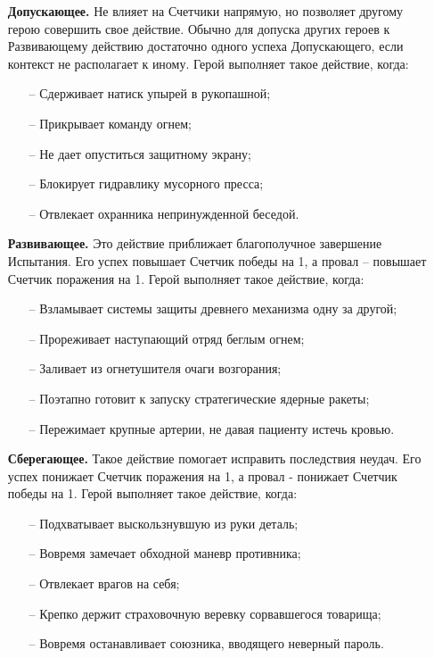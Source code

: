 \begin{itemize}
    \item[]\textbf{Допускающее.} Не влияет на Счетчики напрямую, но позволяет другому герою совершить свое действие. Обычно для допуска других героев к Развивающему действию достаточно одного успеха Допускающего, если контекст не располагает к иному. Герой выполняет такое действие, когда:
    \begin{itemize}
        \item[--] Сдерживает натиск упырей в рукопашной;
        \item[--] Прикрывает команду огнем;
        \item[--] Не дает опуститься защитному экрану;
        \item[--] Блокирует гидравлику мусорного пресса;
        \item[--] Отвлекает охранника непринужденной беседой.
    \end{itemize}
\item[]\textbf{Развивающее.} Это действие приближает благополучное завершение Испытания. Его успех повышает Счетчик победы на 1, а провал – повышает Счетчик поражения на 1. Герой выполняет такое действие, когда:
\begin{itemize}
    \item[--] Взламывает системы защиты древнего механизма одну за другой;
    \item[--] Прореживает наступающий отряд беглым огнем;
    \item[--] Заливает из огнетушителя очаги возгорания;
    \item[--] Поэтапно готовит к запуску стратегические ядерные ракеты;
    \item[--] Пережимает крупные артерии, не давая пациенту истечь кровью.
    \end{itemize}
\item[]\textbf{Сберегающее.} Такое действие помогает исправить последствия неудач. Его успех понижает Счетчик поражения на 1, а провал - понижает Счетчик победы на 1. Герой выполняет такое действие, когда:
\begin{itemize}
    \item[--] Подхватывает выскользнувшую из руки деталь;
    \item[--] Вовремя замечает обходной маневр противника;
    \item[--] Отвлекает врагов на себя;
    \item[--] Крепко держит страховочную веревку сорвавшегося товарища;
    \item[--] Вовремя останавливает союзника, вводящего неверный пароль.
\end{itemize}


\end{itemize}

